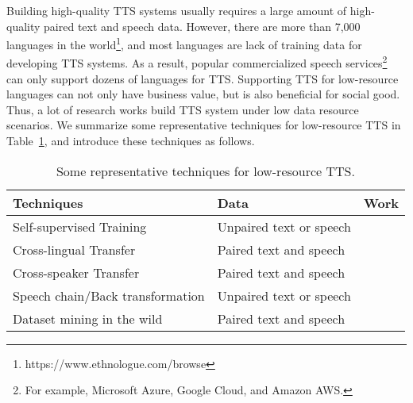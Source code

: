 \documentclass{article}
\begin{document}
Building high-quality TTS systems usually requires a large amount of high-quality paired text and speech data. However, there are more than 7,000 languages in the world\footnote{https://www.ethnologue.com/browse}, and most languages are lack of training data for developing TTS systems. As a result, popular commercialized speech services\footnote{For example, Microsoft Azure, Google Cloud, and Amazon AWS.} can only support dozens of languages for TTS. Supporting TTS for low-resource languages can not only have business value, but is also beneficial for social good. Thus, a lot of research works build TTS system under low data resource scenarios. We summarize some representative techniques for low-resource TTS in Table~\ref{tab_low_resouce_tts}, and introduce these techniques as follows.
\begin{table}[h]
\small
	\caption{Some representative techniques for low-resource TTS.}
	\centering
	\begin{tabular}{l l  l }
		\toprule
		Techniques & Data & Work  \\
		\midrule
		Self-supervised Training &  Unpaired text or speech & ~\cite{chung2019semi,wang2015word,zhang2019joint,fang2019towards,jia2021png,tjandra2019vqvae,liu2020towards,tu2020semi,dunbar2019zero} \\
		Cross-lingual Transfer & Paired text and speech & ~\cite{chen2019end,xu2020lrspeech,azizah2020hierarchical,yang2020towards,de2020efficient,prajwal2021data,he2021multilingual} \\
		Cross-speaker Transfer & Paired text and speech & ~\cite{luong2019training,huybrechts2020low,dai2020noise,yang2020towards,chen2021adaspeech} \\
		Speech chain/Back transformation & Unpaired text or speech & ~\cite{ren2019almost,xu2020lrspeech,tjandra2017listening,tjandra2018machine}  \\
		Dataset mining in the wild & Paired text and speech &~\cite{cooper2019text,hu2019neural,cooper2020pretraining} \\
		\bottomrule
	\end{tabular}
	\label{tab_low_resouce_tts}
\end{table}
\end{document}
